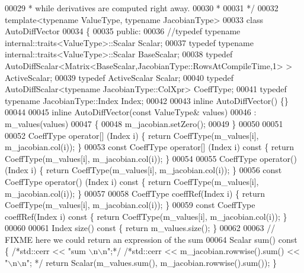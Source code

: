 \begin{DoxyCode}
00029 \textcolor{comment}{  * while derivatives are computed right away.}
00030 \textcolor{comment}{  *}
00031 \textcolor{comment}{  */}
00032 \textcolor{keyword}{template}<\textcolor{keyword}{typename} ValueType, \textcolor{keyword}{typename} JacobianType>
00033 \textcolor{keyword}{class }AutoDiffVector
00034 \{
00035   \textcolor{keyword}{public}:
00036     \textcolor{comment}{//typedef typename internal::traits<ValueType>::Scalar Scalar;}
00037     \textcolor{keyword}{typedef} \textcolor{keyword}{typename} internal::traits<ValueType>::Scalar BaseScalar;
00038     \textcolor{keyword}{typedef} AutoDiffScalar<Matrix<BaseScalar,JacobianType::RowsAtCompileTime,1> > ActiveScalar;
00039     \textcolor{keyword}{typedef} ActiveScalar Scalar;
00040     \textcolor{keyword}{typedef} AutoDiffScalar<typename JacobianType::ColXpr> CoeffType;
00041     \textcolor{keyword}{typedef} \textcolor{keyword}{typename} JacobianType::Index Index;
00042 
00043     \textcolor{keyword}{inline} AutoDiffVector() \{\}
00044 
00045     \textcolor{keyword}{inline} AutoDiffVector(\textcolor{keyword}{const} ValueType& values)
00046       : m\_values(values)
00047     \{
00048       m\_jacobian.setZero();
00049     \}
00050 
00051 
00052     CoeffType operator[] (Index i) \{ \textcolor{keywordflow}{return} CoeffType(m\_values[i], m\_jacobian.col(i)); \}
00053     \textcolor{keyword}{const} CoeffType operator[] (Index i)\textcolor{keyword}{ const }\{ \textcolor{keywordflow}{return} CoeffType(m\_values[i], m\_jacobian.col(i)); \}
00054 
00055     CoeffType operator() (Index i) \{ \textcolor{keywordflow}{return} CoeffType(m\_values[i], m\_jacobian.col(i)); \}
00056     \textcolor{keyword}{const} CoeffType operator() (Index i)\textcolor{keyword}{ const }\{ \textcolor{keywordflow}{return} CoeffType(m\_values[i], m\_jacobian.col(i)); \}
00057 
00058     CoeffType coeffRef(Index i) \{ \textcolor{keywordflow}{return} CoeffType(m\_values[i], m\_jacobian.col(i)); \}
00059     \textcolor{keyword}{const} CoeffType coeffRef(Index i)\textcolor{keyword}{ const }\{ \textcolor{keywordflow}{return} CoeffType(m\_values[i], m\_jacobian.col(i)); \}
00060 
00061     Index size()\textcolor{keyword}{ const }\{ \textcolor{keywordflow}{return} m\_values.size(); \}
00062 
00063     \textcolor{comment}{// FIXME here we could return an expression of the sum}
00064     Scalar sum()\textcolor{keyword}{ const }\{ \textcolor{comment}{/*std::cerr << "sum \(\backslash\)n\(\backslash\)n";*/} \textcolor{comment}{/*std::cerr << m\_jacobian.rowwise().sum() << "\(\backslash\)n\(\backslash\)n";
      */} \textcolor{keywordflow}{return} Scalar(m\_values.sum(), m\_jacobian.rowwise().sum()); \}

\end{DoxyCode}
